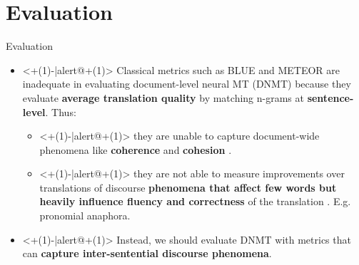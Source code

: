 \section{Evaluation}

\begin{frame}{Evaluation}	
	\begin{itemize}
		\item<+(1)-|alert@+(1)> Classical metrics such as BLUE and METEOR are inadequate in evaluating document-level neural MT (DNMT) because they evaluate \textbf{average translation quality} by matching n-grams at \textbf{sentence-level}. Thus:
		\begin{itemize}
			\item<+(1)-|alert@+(1)> they are unable to capture document-wide phenomena like \textbf{coherence} and \textbf{cohesion} \cite{wong_extending_2012}.
			\item<+(1)-|alert@+(1)> they are not able to measure improvements over translations  of discourse \textbf{phenomena that affect few words but heavily influence fluency and correctness} of the translation \cite{muller_large-scale_2018}. E.g. pronomial anaphora.
		\end{itemize}
		\item<+(1)-|alert@+(1)> Instead, we should evaluate DNMT with metrics that can \textbf{capture inter-sentential discourse phenomena}. 
	\end{itemize}
\end{frame}


